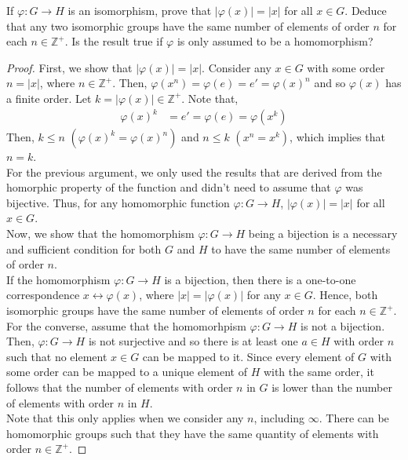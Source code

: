 \documentclass[12pt]{article}
\newcommand{\Z}{\mathbb{Z}}
\newenvironment{problem}[2][Problem]{\begin{trivlist} \item[\hskip \labelsep {\bfseries #1}\hskip \labelsep {\bfseries #2.}]}{\end{trivlist}}
\begin{document}
\begin{problem}{2}
  If $\varphi: G\to H$ is an isomorphism, prove that $|\varphi(x)| = |x|$ for all $x\in G$. Deduce that any two isomorphic groups have the same number of elements of order $n$ for each $n\in \Z^{+}$. Is the result true if $\varphi$ is only assumed to be a homomorphism?
\begin{proof}
  First, we show that $|\varphi(x)|=|x|$. Consider any $x\in G$ with some order $n=|x|$, where $n\in \Z^{+}$. Then, $\varphi(x^{n}) = \varphi(e) = e' = \varphi(x)^{n}$ and so $\varphi(x)$ has a finite order. Let $k=|\varphi(x)|\in \Z^{+}$. Note that, 
\begin{align*}
  \varphi(x)^{k} &= e' = \varphi(e) = \varphi(x^{k})
\end{align*}
Then, $k\leq n$ $(\varphi(x)^{k} = \varphi(x)^{n})$ and $n\leq k$ $(x^{n} = x^{k})$, which implies that $n=k$.\\
For the previous argument, we only used the results that are derived from the homorphic property of the function and didn't need to assume that $\varphi$ was bijective. Thus, for any homomorphic function $\varphi: G\to H$, $|\varphi(x)|=|x|$ for all $x\in G$.\\

Now, we show that the homomorphism $\varphi:G\to H$ being a bijection is a necessary and sufficient condition for both $G$ and $H$ to have the same number of elements of order $n$.\\
If the homomorphism $\varphi:G\to H$ is a bijection, then there is a one-to-one correspondence $x\leftrightarrow \varphi(x)$, where $|x|=|\varphi(x)|$ for any $x\in G$. Hence, both isomorphic groups have the same number of elements of order $n$ for each $n\in \Z^{+}$. \\

For the converse, assume that the homomorhpism $\varphi:G\to H$ is not a bijection. Then, $\varphi:G\to H$ is not surjective and so there is at least one $a\in H$ with order $n$ such that no element $x\in G$ can be mapped to it. Since every element of $G$ with some order can be mapped to a unique element of $H$ with the same order, it follows that the number of elements with order $n$ in $G$ is lower than the number of elements with order $n$ in $H$. \\

Note that this only applies when we consider any $n$, including $\infty$. There can be homomorphic groups such that they have the same quantity of elements with order $n\in \Z^{+}$.
\end{proof}
\end{problem}

       
\end{document}
